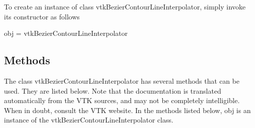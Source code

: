 To create an instance of class vtk\-Bezier\-Contour\-Line\-Interpolator, simply invoke its constructor as follows \begin{DoxyVerb}  obj = vtkBezierContourLineInterpolator
\end{DoxyVerb}
 \hypertarget{vtkwidgets_vtkxyplotwidget_Methods}{}\subsection{Methods}\label{vtkwidgets_vtkxyplotwidget_Methods}
The class vtk\-Bezier\-Contour\-Line\-Interpolator has several methods that can be used. They are listed below. Note that the documentation is translated automatically from the V\-T\-K sources, and may not be completely intelligible. When in doubt, consult the V\-T\-K website. In the methods listed below, {\ttfamily obj} is an instance of the vtk\-Bezier\-Contour\-Line\-Interpolator class. 
